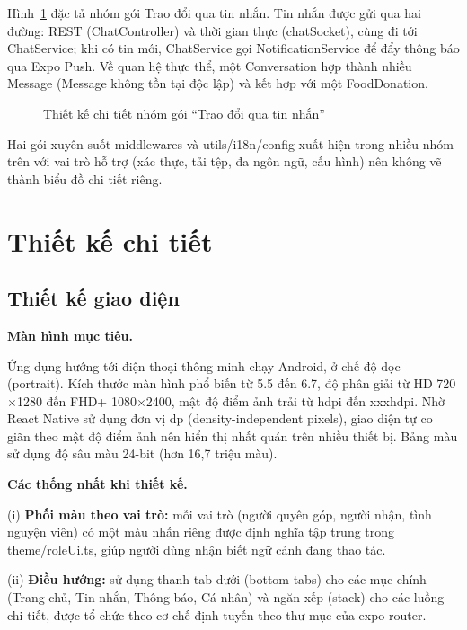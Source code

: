 \documentclass[../main.tex]{subfiles}%
\begin{document}
Hình~\ref{fig:pkg_chat} đặc tả nhóm gói Trao đổi qua tin nhắn. Tin nhắn được gửi qua hai đường: REST (ChatController) và thời gian thực (chatSocket), cùng đi tới ChatService; khi có tin mới, ChatService gọi NotificationService để đẩy thông báo qua Expo Push. Về quan hệ thực thể, một Conversation hợp thành nhiều Message (Message không tồn tại độc lập) và kết hợp với một FoodDonation.

\begin{figure}[H]
    \centering
    \caption{Thiết kế chi tiết nhóm gói ``Trao đổi qua tin nhắn''}
    \label{fig:pkg_chat}
\end{figure}

Hai gói xuyên suốt middlewares và utils/i18n/config xuất hiện trong nhiều nhóm trên với vai trò hỗ trợ (xác thực, tải tệp, đa ngôn ngữ, cấu hình) nên không vẽ thành biểu đồ chi tiết riêng.

\section{Thiết kế chi tiết}
\label{section:4.2}

\subsection{Thiết kế giao diện}
\label{subsection:4.2.1}

\textbf{Màn hình mục tiêu.}

Ứng dụng hướng tới điện thoại thông minh chạy Android, ở chế độ dọc (portrait). Kích thước màn hình phổ biến từ 5.5\textquotedbl{} đến 6.7\textquotedbl{}, độ phân giải từ HD 720$\times$1280 đến FHD+ 1080$\times$2400, mật độ điểm ảnh trải từ hdpi đến xxxhdpi. Nhờ React Native sử dụng đơn vị dp (density-independent pixels), giao diện tự co giãn theo mật độ điểm ảnh nên hiển thị nhất quán trên nhiều thiết bị. Bảng màu sử dụng độ sâu màu 24-bit (hơn 16,7 triệu màu).

\textbf{Các thống nhất khi thiết kế.}

(i) \textbf{Phối màu theo vai trò:} mỗi vai trò (người quyên góp, người nhận, tình nguyện viên) có một màu nhấn riêng được định nghĩa tập trung trong theme/roleUi.ts, giúp người dùng nhận biết ngữ cảnh đang thao tác.
  
(ii) \textbf{Điều hướng:} sử dụng thanh tab dưới (bottom tabs) cho các mục chính (Trang chủ, Tin nhắn, Thông báo, Cá nhân) và ngăn xếp (stack) cho các luồng chi tiết, được tổ chức theo cơ chế định tuyến theo thư mục của expo-router.
\end{document}
